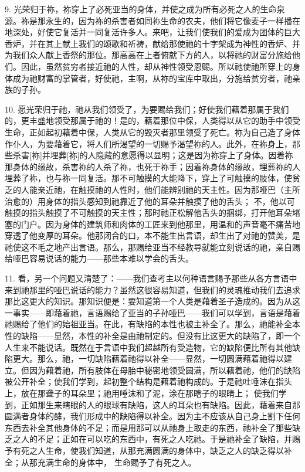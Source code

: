 9. 光荣归于祢，祢穿上了必死亚当的身体，并使之成为所有必死之人的生命泉源。祢是那永生的，因为祢的杀害者如同祢生命的农夫，他们将它像麦子一样播在地深处，好使它复活并一同复活许多人。来吧，让我们使我们的爱成为团体的巨大香炉，并在其上献上我们的颂歌和祈祷，献给那使祂的十字架成为神性的香炉、并为我们众人献上香祭的那位。那高高在上者俯就下方的人，以将祂的财富分施给他们。因此，虽然贫穷者接近祂的人性，却从神性领受恩赐。所以祂使祂所穿上的身体成为祂财富的掌管者，好使祂，主啊，从祢的宝库中取出，分施给贫穷者，祂亲族的子孙。\par

10. 愿光荣归于祂，祂从我们领受了，为要赐给我们；好使我们藉着那属于我们的，更丰盛地领受那属于祂的！是的，藉着那位中保，人类得以从它的助手中领受生命，正如起初藉着中保，人类从它的毁灭者那里领受了死亡。祢为自己造了身体作仆人，为要藉着它，将人们所渴望的一切赐予渴望祢的人。此外，在祢身上，那些杀害[祢]并埋葬[祢]的人隐藏的意愿得以显明；这是因为祢穿上了身体。因着祢那身体的缘故，杀害祢的人杀了祢，也死于祢手；因着祢身体的缘故，埋葬祢的人埋葬了祢，也与祢一同复活。那不可触摸的大能降下，穿上了可触摸的肢体，使贫乏的人能亲近祂，在触摸祂的人性时，他们能辨别祂的天主性。因为那哑巴（主所治愈的）用身体的指头感知到祂靠近了他的耳朵并触摸了他的舌头； 不，他以可触摸的指头触摸了不可触摸的天主性；那时祂正松解他舌头的捆绑，打开他耳朵堵塞的门户。因为身体的建筑师和肉体的工匠来到他那里，用温和的声音毫不痛苦地穿透了他变厚的耳朵。他那闭合的口，本不能生出言语，却生出了对祂的赞美，是祂使这不毛之地产出言语。那么，那赐给亚当不经教导就能立刻说话的祂，亲自赐给哑巴容易说话的能力——那些本难以学会的舌头。\par

11. 看，另一个问题又清楚了：——我们查考主以何种语言赐予那些从各方言语中来到祂那里的哑巴说话的能力？虽然这很容易知道，但我们的灵魂推动我们去追求那比这更大的知识。那知识便是：要知道第一个人类是藉着圣子造成的。因为从这一事实——即藉着祂，言语赐给了亚当的子孙哑巴——我们可以学到，言语是藉着祂赐给了他们的始祖亚当。在此，有缺陷的本性也被主补全了。那么，祂能补全本性的缺陷——显然，本性的补全是由祂制定的。但没有比这更大的缺陷了，即一个人生来不能说话。既然在于言语中我们超越所有受造物，它的缺陷便比所有其他缺陷更大。那么，祂，一切缺陷藉着祂得以补全——显然，一切圆满藉着祂得以建立。但因为藉着祂，所有肢体在母胎中秘密地领受圆满，所以藉着祂，他们的缺陷被公开补全；使我们学到，起初整个结构是藉着祂构成的。于是祂吐唾沫在指头上，放在那聋子的耳朵里；祂用唾沫和了泥，涂在那瞎子的眼睛上； 使我们学到，正如那生来瞎眼的人的眼球有缺陷，这人的耳朵也有缺陷。因此，藉着来自那圆满者身体的酵，我们形成中的缺陷得以补全。因为主不应该从自己身上割下任何东西去补全其他身体的不足；而是用那可以从祂身上取走的东西，祂补全了那些缺乏之人的不足；正如在可以吃的东西中，有死之人吃祂。于是祂补全了缺陷，并赐予有死之人生命，使我们知道，从那充满圆满的身体中，缺乏之人的缺乏得以补全；从那充满生命的身体中， 生命赐予了有死之人。\par

